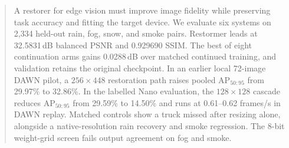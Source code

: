 \begin{abstract}
A restorer for edge vision must improve image fidelity while preserving task accuracy and fitting the target device. We evaluate six systems on 2,334 held-out rain, fog, snow, and smoke pairs. Restormer leads at 32.5831\,dB balanced PSNR and 0.929690 SSIM. The best of eight continuation arms gains 0.0288\,dB over matched continued training, and validation retains the original checkpoint. In an earlier local 72-image DAWN pilot, a $256\times448$ restoration path raises pooled AP$_{50:95}$ from 29.97\% to 32.86\%. In the labelled Nano evaluation, the $128\times128$ cascade reduces AP$_{50:95}$ from 29.59\% to 14.50\% and runs at 0.61--0.62 frames/s in DAWN replay. Matched controls show a truck missed after resizing alone, alongside a native-resolution rain recovery and smoke regression. The 8-bit weight-grid screen fails output agreement on fog and smoke.
\end{abstract}
